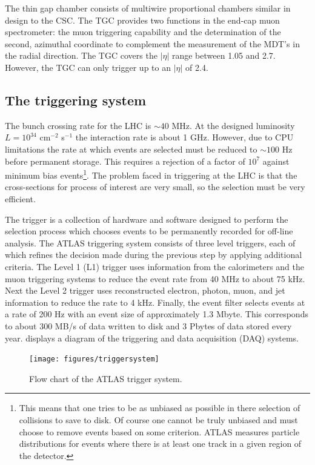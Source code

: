 The thin gap chamber consists of multiwire proportional chambers similar
in design to the CSC. The TGC provides two functions in the end-cap muon spectrometer:
the muon triggering capability and the determination of the second, azimuthal 
coordinate to complement the measurement of the MDT's in the radial direction.
The TGC covers the $|\eta|$ range between 1.05 and 2.7. However, the TGC
can only trigger up to an $|\eta|$ of 2.4.

\subsection{The triggering system}
The bunch crossing rate for the LHC is $\sim 40$ MHz. At the designed luminosity
$L = 10^{34}$ cm$^{-2}$ s$^{-1}$ the interaction rate is about 1 GHz. However,
due to CPU limitations the rate at which events are selected must be reduced
to $\sim 100$ Hz before permanent storage. This requires a rejection of
a factor of $10^7$ against minimum bias events\footnote{This means that
one tries to be as unbiased as possible in there selection of collisions 
to save to disk. Of course one cannot be truly unbiased and must choose
to remove events based on some criterion. ATLAS measures particle distributions
for events where there is at least one track in a given region of the detector.}.
The problem faced in triggering at the LHC is that the cross-sections for
process of interest are very small, so the selection must be very 
efficient.

The trigger is a collection of hardware and software designed to perform
the selection process which chooses events to be permanently recorded for
off-line analysis. The ATLAS triggering system consists of three level triggers,
each of which refines the decision made during the previous step by applying
additional criteria. The Level 1 (L1) trigger uses information from the
calorimeters and the muon triggering systems to reduce the event rate from
40 MHz to about 75 kHz. Next the Level 2 trigger uses reconstructed electron,
photon, muon, and jet information to reduce the rate to 4 kHz. Finally,
the event filter selects events at a rate of 200 Hz with an event size
of approximately 1.3 Mbyte. This corresponds to about 300 MB/s of data written 
to disk and 3 Pbytes of data stored every year.  displays 
a diagram of the triggering and data acquisition (DAQ) systems.

\begin{figure}[!hbpt]
  \centering
  \texttt{[image: figures/triggersystem]}
  \caption{Flow chart of the ATLAS trigger system.}
  \label{fig:trigger}
\end{figure}
